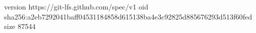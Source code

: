version https://git-lfs.github.com/spec/v1
oid sha256:a2eb7292041baff04531184858d615138ba4e3c92825d885676293d513f60fed
size 87544
